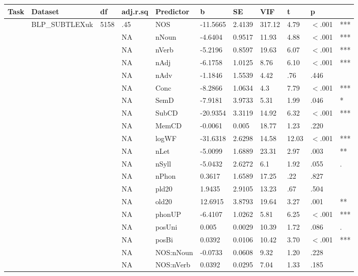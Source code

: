 \begin{table}[ht]
\centering
\begingroup\normalsize
\begin{tabular}{lllllllllll}
  \hline
Task & Dataset & df & adj.r.sq & Predictor & b & SE & VIF & t & p &  \\ 
  \hline
 & BLP\_SUBTLEXuk & 5158 & .45 & NOS & -11.5665 & 2.4139 & 317.12 & 4.79 & $<$.001 & *** \\ 
   &  &  & NA & nNoun & -4.6404 & 0.9517 & 11.93 & 4.88 & $<$.001 & *** \\ 
   &  &  & NA & nVerb & -5.2196 & 0.8597 & 19.63 & 6.07 & $<$.001 & *** \\ 
   &  &  & NA & nAdj & -6.1758 & 1.0125 & 8.76 & 6.10 & $<$.001 & *** \\ 
   &  &  & NA & nAdv & -1.1846 & 1.5539 & 4.42 & .76 & .446 &   \\ 
   &  &  & NA & Conc & -8.2866 & 1.0634 & 4.3 & 7.79 & $<$.001 & *** \\ 
   &  &  & NA & SemD & -7.9181 & 3.9733 & 5.31 & 1.99 & .046 & * \\ 
   &  &  & NA & SubCD & -20.9354 & 3.3119 & 14.92 & 6.32 & $<$.001 & *** \\ 
   &  &  & NA & MemCD & -0.0061 & 0.005 & 18.77 & 1.23 & .220 &   \\ 
   &  &  & NA & logWF & -31.6318 & 2.6298 & 14.58 & 12.03 & $<$.001 & *** \\ 
   &  &  & NA & nLet & -5.0099 & 1.6889 & 23.31 & 2.97 & .003 & ** \\ 
   &  &  & NA & nSyll & -5.0432 & 2.6272 & 6.1 & 1.92 & .055 & . \\ 
   &  &  & NA & nPhon & 0.3617 & 1.6589 & 17.25 & .22 & .827 &   \\ 
   &  &  & NA & pld20 & 1.9435 & 2.9105 & 13.23 & .67 & .504 &   \\ 
   &  &  & NA & old20 & 12.6915 & 3.8793 & 19.64 & 3.27 & .001 & ** \\ 
   &  &  & NA & phonUP & -6.4107 & 1.0262 & 5.81 & 6.25 & $<$.001 & *** \\ 
   &  &  & NA & posUni & 0.005 & 0.0029 & 10.39 & 1.72 & .086 & . \\ 
   &  &  & NA & posBi & 0.0392 & 0.0106 & 10.42 & 3.70 & $<$.001 & *** \\ 
   &  &  & NA & NOS:nNoun & -0.0733 & 0.0608 & 9.32 & 1.20 & .228 &   \\ 
   &  &  & NA & NOS:nVerb & 0.0392 & 0.0295 & 7.04 & 1.33 & .185 &   \\ 

\end{tabular}
\end{table}
